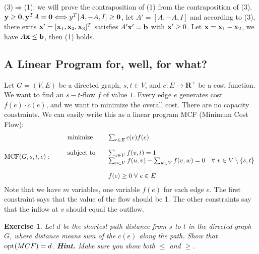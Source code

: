 \documentclass[12pt,a4]{article}
\newtheorem{exercise}[theorem]{Exercise}
\begin{document}
(3)$\Longrightarrow$(1): we will prove the contraposition of (1) from the contraposition of (3). 
$\mathbf{y} \geq \mathbf{0}, \mathbf{y}^TA = \mathbf{0} \Longleftrightarrow y^T [A, -A, I] \geq \mathbf{0}$, let $A' = [A, -A, I]$ and according to (3), there exits $\mathbf{x}' = [\mathbf{x}_1, \mathbf{x}_2, \mathbf{x}_3]^T$ satisfies $A'\mathbf{x}' = \mathbf{b}$ with $\mathbf{x}'\geq 0$. Let $\mathbf{x} = \mathbf{x}_1 - \mathbf{x}_2$, we have $A\mathbf{x} \leq \mathbf{b}$, then (1) holds.

\subsection{A Linear Program for, well, for what?}




Let $G = (V,E)$ be a directed graph, $s,t \in V$,  and $c: E \rightarrow \mathbf{R}^+$ be a cost 
function. We want to find an $s-t$-flow $f$ of value $1$. Every edge $e$ generates cost $f(e) \cdot c(e)$, and we want to minimize the overall cost. There are no capacity constraints.
We can easily write this as a linear program MCF (Minimum Cost Flow):
\begin{align*}
  \textrm{MCF}(G,s,t,c): \qquad
  \begin{array}{ll}
    \textnormal{minimize} \quad & \multicolumn{1}{l}{\sum_{e \in E} c(e) f(e)} \\
    \\
    \textnormal{subject to} \quad & \sum_{v \in V} f(v,t)  = 1 \\
					        & \sum_{u \in V} f(u,v) - \sum_{w \in V} f(v,w)  = 0  \quad \forall\ v \in V  \setminus \{s,t\}\\
					        \\
     & f(e)  \geq 0 \ \forall \ e \in E 
  \end{array}
\end{align*}
Note that we have $m$ variables, one variable $f(e)$ for each edge $e$.
The first constraint says that the value of the flow should be 1. The other constraints say that 
the inflow at $v$ should equal the outflow.

\begin{exercise}
   Let $d$ be the shortest path distance from $s$ to $t$ in the directed graph $G$, where distance
   means sum of the $c(e)$ along the path. Show that $\textup{\textrm{opt}}(MCF) = d$.
   \textbf{Hint.} Make sure you show both $\leq$ and $\geq$.
\end{exercise}
\end{document}
